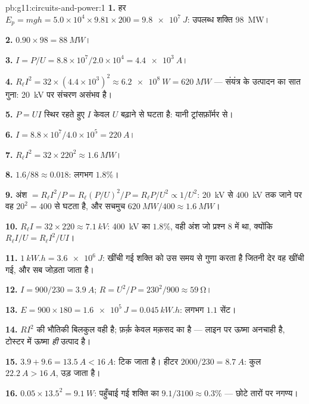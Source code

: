 \begin{solution}{pb:g11:circuits-and-power:1}
\textbf{1.} हर  $E_p = mgh = 5.0\times10^{4} \times 9.81 \times
200 = \qty{9.8e7}{J}$: उपलब्ध शक्ति \qty{98}{MW}।

\textbf{2.} $0.90 \times 98 = \qty{88}{MW}$।

\textbf{3.} $I = P/U = 8.8\times10^{7}/2.0\times10^{4} = \qty{4.4e3}{A}$।

\textbf{4.} $R_\ell I^2 = 32 \times (4.4\times10^{3})^2 \approx
\qty{6.2e8}{W} = \qty{620}{MW}$ --- संयंत्र के उत्पादन का सात गुना: \qty{20}{kV} पर संचरण
असंभव है।

\textbf{5.} $P = UI$ स्थिर रहते हुए $I$ केवल $U$ बढ़ाने से घटता है:
यानी ट्रांसफ़ॉर्मर से।

\textbf{6.} $I = 8.8\times10^{7}/4.0\times10^{5} = \qty{220}{A}$।

\textbf{7.} $R_\ell I^2 = 32 \times 220^2 \approx \qty{1.6}{MW}$।

\textbf{8.} $1.6/88 \approx 0.018$: लगभग $1.8\%$।

\textbf{9.} अंश $= R_\ell I^2/P = R_\ell (P/U)^2/P = R_\ell P/U^2
\propto 1/U^2$: \qty{20}{kV} से \qty{400}{kV} तक जाने पर वह $20^2 = 400$ से घटता है,
और सचमुच $\qty{620}{MW}/400 \approx \qty{1.6}{MW}$।

\textbf{10.} $R_\ell I = 32 \times 220 \approx \qty{7.1}{kV}$: \qty{400}{kV} का $1.8\%$, वही अंश जो प्रश्न 8 में था,
क्योंकि $R_\ell I/U = R_\ell I^2/UI$।

\textbf{11.} $\qty{1}{kW.h} = \qty{3.6e6}{J}$:  खींची गई शक्ति को उस समय से गुणा करता है
जितनी देर वह खींची गई, और सब जोड़ता जाता है।

\textbf{12.} $I = 900/230 = \qty{3.9}{A}$; $R = U^2/P = 230^2/900 \approx \qty{59}{\ohm}$।

\textbf{13.} $E = 900 \times 180 = \qty{1.6e5}{J} = \qty{0.045}{kW.h}$: लगभग $1.1$ सेंट।

\textbf{14.} $RI^2$ की भौतिकी बिलकुल वही है; फ़र्क़ केवल मक़सद का है ---
लाइन पर ऊष्मा अनचाही है, टोस्टर में ऊष्मा \emph{ही} उत्पाद है।

\textbf{15.} $3.9 + 9.6 = \qty{13.5}{A} < \qty{16}{A}$: टिक जाता है। हीटर $2000/230 = \qty{8.7}{A}$: कुल $\qty{22.2}{A} > \qty{16}{A}$, 
उड़ जाता है।

\textbf{16.} $0.05 \times 13.5^2 = \qty{9.1}{W}$: पहुँचाई गई शक्ति का $9.1/3100 \approx
0.3\%$ --- छोटे तारों पर
नगण्य।


\end{solution}
